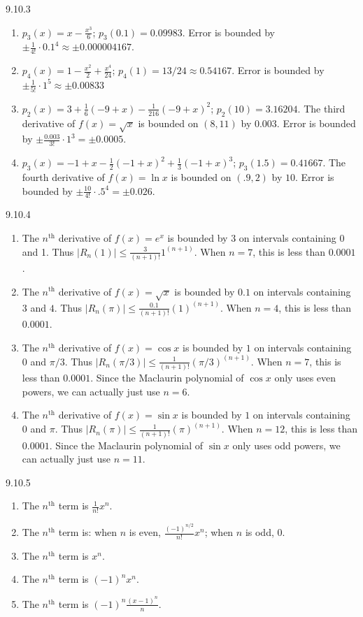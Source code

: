\begin{Answer}{9.10.3}
\begin{enumerate}
\item
{$p_3(x) =x-\frac{x^3}{6}$; $p_3(0.1) = 0.09983$. Error is bounded by $\pm \frac{1}{4!}\cdot0.1^4 \approx \pm 0.000004167$.
}
\item
{$p_4(x) =1-\frac{x^2}{2}+\frac{x^4}{24}$; $p_4(1) = 13/24\approx 0.54167$. Error is bounded by $\pm \frac{1}{5!}\cdot1^5 \approx \pm 0.00833$
}
\item
{$p_2(x) =3+\frac{1}{6} (-9+x)-\frac{1}{216} (-9+x)^2$; $p_2(10) =  3.16204$. The third derivative of $f(x) =\sqrt x$ is bounded on $(8,11)$ by $0.003$. Error is bounded by $\pm \frac{0.003}{3!}\cdot1^3 = \pm 0.0005.$
}
\item
{$p_3(x) =-1+x-\frac{1}{2} (-1+x)^2+\frac{1}{3} (-1+x)^3$; $p_3(1.5) =  0.41667$. The fourth derivative of $f(x) =\ln x$ is bounded on $(.9,2)$ by $10$. Error is bounded by $\pm \frac{10}{4!}\cdot.5^4 = \pm 0.026.$
}
\end{enumerate}
\end{Answer}
\begin{Answer}{9.10.4}
\begin{enumerate}
\item
{The $n^\text{th}$ derivative of $f(x)=e^x$ is bounded by $3$ on intervals containing $0$ and 1. Thus $|R_n(1)|\leq \frac{3}{(n+1)!}1^{(n+1)}$. When $n=7$, this is less than $0.0001$.
}
\item
{The $n^\text{th}$ derivative of $f(x)=\sqrt x$ is bounded by $0.1$ on intervals containing $3$ and $4$. Thus $|R_n(\pi)|\leq \frac{0.1}{(n+1)!}(1)^{(n+1)}$. When $n=4$, this is less than $0.0001$.
}
\item
{The $n^\text{th}$ derivative of $f(x)=\cos x$ is bounded by $1$ on intervals containing $0$ and $\pi/3$. Thus $|R_n(\pi/3)|\leq \frac{1}{(n+1)!}(\pi/3)^{(n+1)}$. When $n=7$, this is less than $0.0001$. Since the Maclaurin polynomial of $\cos x$ only uses even powers, we can actually just use $n=6$.
}
\item
{The $n^\text{th}$ derivative of $f(x)=\sin x$ is bounded by $1$ on intervals containing $0$ and $\pi$. Thus $|R_n(\pi)|\leq \frac{1}{(n+1)!}(\pi)^{(n+1)}$. When $n=12$, this is less than $0.0001$. Since the Maclaurin polynomial of $\sin x$ only uses odd powers, we can actually just use $n=11$.
}
\end{enumerate}
\end{Answer}
\begin{Answer}{9.10.5}
\begin{enumerate}
\item
{The $n^\text{th}$ term is $\frac{1}{n!}x^n$.
}
\item
{The $n^\text{th}$ term is: when $n$ is even,  $\frac{(-1)^{n/2}}{n!}x^n$; when $n$ is odd, $0$.
}
\item
{The $n^\text{th}$ term is $x^n$.
}
\item
{The $n^\text{th}$ term is $(-1)^nx^n$.
}
\item
{The $n^\text{th}$ term is $(-1)^n\frac{(x-1)^n}{n}$.
}
\end{enumerate}
\end{Answer}
